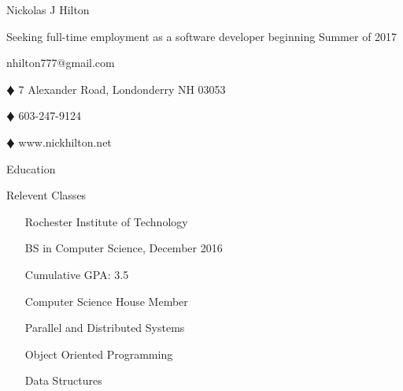 \documentclass{article}
\newcommand{\lineseparator}[1]{\noindent\makebox[\linewidth]{\rule{\textwidth}{#1}}}
\begin{document}
\begin{minipage}[t]{0.4\textwidth}
  \hspace{-6.5mm}
  {\Huge Nickolas J Hilton }
\end{minipage}
\hspace{-6.5mm}
\begin{minipage}[b]{0.6\textwidth}
  \begin{flushright}
    {\small Seeking full-time employment as a software developer beginning Summer of 2017 }
  \end{flushright}
\end{minipage}
\vspace{1mm}
\lineseparator{1.5pt}
\vspace{-3mm}
\begin{center}
  nhilton777@gmail.com 
  \begin{inparaitem}
  \item[$\vardiamond$] 7 Alexander Road, Londonderry NH 03053     
  \item[$\vardiamond$] 603-247-9124 
  \item[$\vardiamond$] www.nickhilton.net 
  \end{inparaitem}
\end{center}
\begin{minipage}[t]{0.5\textwidth}
  {\Large Education } 
\end{minipage}
\begin{minipage}[t]{0.5\textwidth}
  {\Large Relevent Classes } 
\end{minipage}
\lineseparator{0.5pt}
\vspace{3mm}
\begin{minipage}[t]{0.5\textwidth}
  \vspace{0.5mm}
  \begin{itemize}
    \item[] Rochester Institute of Technology  \vspace{-1mm}  
    \item[] BS in Computer Science, December 2016 \vspace{-1mm}  
    \item[] Cumulative GPA: 3.5 \vspace{-1mm}  
    \item[] Computer Science House Member \vspace{-1mm}  
  \end{itemize}
\end{minipage}
\begin{minipage}[t]{0.5\textwidth}
  \vspace{0.5mm}
  \begin{itemize}
    \item[] Parallel and Distributed Systems \vspace{-1mm}  
    \item[] Object Oriented Programming \vspace{-1mm}  
    \item[] Data Structures \vspace{-1mm}  
  \end{itemize}
\end{minipage}
\end{document}
